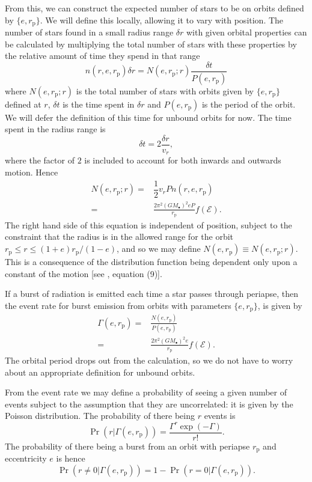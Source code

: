 \documentclass[useAMS,usedcolumn,usegraphicx,usenatbib]{mn2e}
\newcommand{\sub}[1]{\ensuremath{_\mathrm{#1}}}
\newcommand{\recip}[1]{\ensuremath{\dfrac{1}{#1}}}
\begin{document}
From this, we can construct the expected number of stars to be on orbits defined by $\{e, r\sub{p}\}$. We will define this locally, allowing it to vary with position. The number of stars found in a small radius range $\delta r$ with given orbital properties can be calculated by multiplying the total number of stars with these properties by the relative amount of time they spend in that range
\begin{equation}
n(r, e, r\sub{p})\delta r = N(e, r\sub{p}; r)\frac{\delta t}{P(e, r\sub{p})}
\end{equation}
where $N(e, r\sub{p}; r)$ is the total number of stars with orbits given by $\{e, r\sub{p}\}$ defined at $r$, $\delta t$ is the time spent in $\delta r$ and $P(e, r\sub{p})$ is the period of the orbit. We will defer the definition of this time for unbound orbits for now. The time spent in the radius range is
\begin{equation}
\delta t = 2\frac{\delta r}{v_r},
\end{equation}
where the factor of $2$ is included to account for both inwards and outwards motion. Hence
\begin{align}
N(e, r\sub{p}; r) = {} & \recip{2} v_r P n(r, e, r\sub{p})\\
 = {} & \frac{2\pi^2(GM_\bullet)^2 e P}{r\sub{p}}f(\mathcal{E}).
\end{align}
The right hand side of this equation is independent of position, subject to the constraint that the radius is in the allowed range for the orbit $r\sub{p} \leq r \leq (1+e)r\sub{p}/(1-e)$, and so we may define $N(e, r\sub{p}) \equiv N(e, r\sub{p}; r)$. This is a consequence of the distribution function being dependent only upon a constant of the motion [see \citet{Bahcall1976}, equation (9)].

If a burst of radiation is emitted each time a star passes through periapse, then the event rate for burst emission from orbits with parameters $\{e, r\sub{p}\}$, is given by
\begin{align}
\Gamma(e, r\sub{p}) = {} & \frac{N(e, r\sub{p})}{P(e, r\sub{p})}\\
 = {} & \frac{2\pi^2(GM_\bullet)^2 e}{r\sub{p}}f(\mathcal{E}).
\label{eq:Gamma}
\end{align}
The orbital period drops out from the calculation, so we do not have to worry about an appropriate definition for unbound orbits.

From the event rate we may define a probability of seeing a given number of events subject to the assumption that they are uncorrelated: it is given by the Poisson distribution. The probability of there being $r$ events is
\begin{equation}
\Pr(r|\Gamma(e, r\sub{p})) = \frac{\Gamma^r\exp(-\Gamma)}{r!}.
\end{equation}
The probability of there being a burst from an orbit with periapse $r\sub{p}$ and eccentricity $e$ is hence
\begin{equation}
\Pr(r \neq 0|\Gamma(e, r\sub{p})) = 1 - \Pr(r = 0|\Gamma(e, r\sub{p})).
\end{equation}
\end{document}
